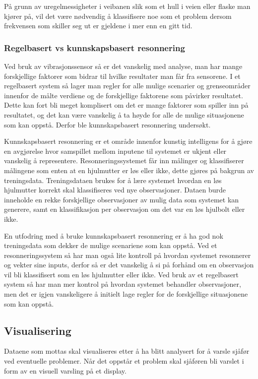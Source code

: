 På grunn av uregelmessigheter i veibanen slik som et hull i veien eller flaske 
man kjører på, vil det være nødvendig å klassifisere noe som et problem dersom 
frekvensen som skiller seg ut er gjeldene i mer enn en gitt tid.

\subsubsection{Regelbasert vs kunnskapsbasert resonnering}
Ved bruk av vibrasjonssensor så er det vanskelig med analyse, man har mange 
forskjellige faktorer som bidrar til hvilke resultater man får fra sensorene.
I et regelbasert system så lager man regler for alle mulige scenarier og 
grenseområder innenfor de målte verdiene og de forskjellige faktorene som 
påvirker resultatet. Dette kan fort bli meget komplisert om det er mange faktorer 
som spiller inn på resultatet, og det kan være vanskelig å ta høyde for alle de 
mulige situasjonene som kan oppstå. Derfor ble kunnskapsbasert resonnering undersøkt. 

Kunnskapsbasert resonnering er et område innenfor kunstig intelligens for å gjøre 
en avgjørelse hvor samspillet mellom inputene til systemet er ukjent eller vanskelig 
å representere. Resonneringssystemet får inn målinger og klassifiserer målingene 
som enten at en hjulmutter er løs eller ikke, dette gjøres på bakgrun av treningsdata. 
Treningsdataen brukes for å lære systemet hvordan en løs hjulmutter korrekt skal 
klassifiseres ved nye observasjoner. Dataen burde inneholde en rekke forskjellige 
observasjoner av mulig data som systemet kan generere, samt en klassifikasjon per 
observasjon om det var en løs hjulbolt eller ikke.

En utfodring med å bruke kunnskapsbasert resonnering er å ha god nok treningsdata 
som dekker de mulige scenariene som kan oppstå. Ved et resonneringssystem så har 
man også lite kontroll på hvordan systemet resonnerer og vekter sine inputs, derfor 
så er det vanskelig å si på forhånd om en observasjon vil bli klassifisert som en løs 
hjulmutter eller ikke. Ved bruk av et regelbasert system så har man mer kontrol på 
hvordan systemet behandler observasjoner, men det er igjen vanskeligere å initielt 
lage regler for de forskjellige situasjonene som kan oppstå.

\subsection{Visualisering}
Dataene som mottas skal visualiseres etter å ha blitt analysert for å varsle 
sjåfør ved eventuelle problemer. Når det oppstår et problem skal sjåføren bli 
varslet i form av en visuell varsling på et display.

